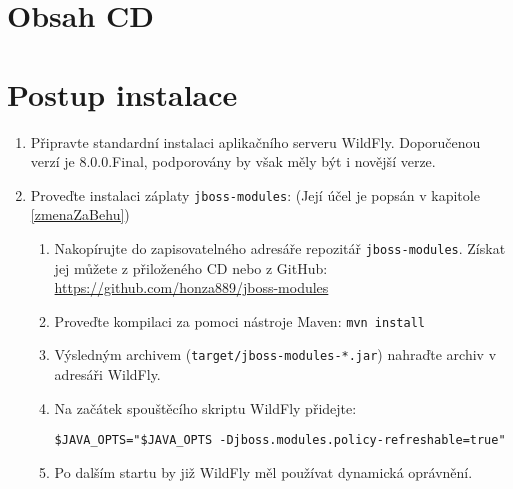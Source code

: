 \chapter{Obsah CD}


\chapter{Postup instalace}

\begin{enumerate}
  \item Připravte standardní instalaci aplikačního serveru WildFly. Doporučenou verzí je 8.0.0.Final, podporovány by však měly být i novější verze.
  
  \item Proveďte instalaci záplaty {\tt jboss-modules}: (Její účel je popsán v kapitole \ref{zmenaZaBehu})
  \begin{enumerate}
    \item Nakopírujte do zapisovatelného adresáře repozitář {\tt jboss-modules}. Získat jej můžete z přiloženého CD nebo z GitHub:
      \newline\url{https://github.com/honza889/jboss-modules}
    \item Proveďte kompilaci za pomoci nástroje Maven: {\tt mvn install}
    \item Výsledným archivem ({\tt target/jboss-modules-*.jar}) nahraďte archiv  v adresáři WildFly.
    \item Na začátek spouštěcího skriptu WildFly přidejte:
      \begin{lstlisting}
$JAVA_OPTS="$JAVA_OPTS -Djboss.modules.policy-refreshable=true"
      \end{lstlisting}
    \item Po dalším startu by již WildFly měl používat dynamická oprávnění.
  \end{enumerate}
  

\end{enumerate}
